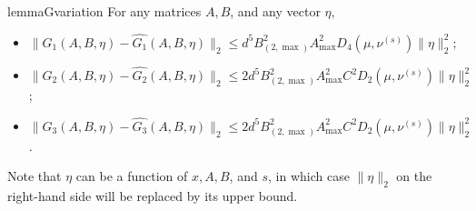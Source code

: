 \begin{restatable}{lemma}{Gvariation}
	\label{lem:Gvariation}
	For any matrices $A,B$, and any vector $\eta$,
	\begin{itemize}
		\item $\|G_1(A,B,\eta) - \widehat{G_1}(A,B,\eta)\|_2 \le  d^5  B_{(2,\max)}^2A_{\max}^2D_4(\mu, \nu^{(s)})\|\eta\|_2^2$;
		\item $\|G_2(A,B,\eta) - \widehat{G_2}(A,B,\eta)\|_2 \le 2 d^5  B_{(2,\max)}^2A_{\max}^2C^2D_2(\mu, \nu^{(s)})\|\eta\|_2^2$;
		\item $\|G_3(A,B,\eta) - \widehat{G_3}(A,B,\eta)\|_2 \le 2 d^5  B_{(2,\max)}^2A_{\max}^2C^2D_2(\mu, \nu^{(s)})\|\eta\|_2^2$.
	\end{itemize}
	Note that $\eta$ can be a function of $x, A, B$, and $s$, in which case $\|\eta\|_2$ on the right-hand side will be replaced by its upper bound.
\end{restatable}
